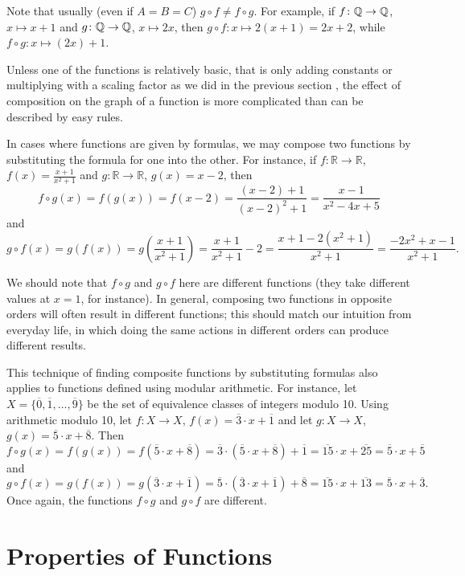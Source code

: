 Note that usually (even if $A=B=C$) $g\circ f\not=f\circ g$. For example, if
$f\colon{\mathbb Q}\to{\mathbb Q}$, $x\mapsto x+1$ and
$g\colon{\mathbb Q}\to{\mathbb Q}$, $x\mapsto 2x$, then $g\circ f\colon x\mapsto 2(x+1)=2x+2$, while
$f\circ g\colon x\mapsto (2x)+1$.
\smallskip

Unless one of the functions is relatively basic, that is only adding
constants or multiplying with a scaling factor as we did in the previous
section , the effect of
composition on the graph of a function is more complicated than can be
described by easy rules.
\bigskip

In cases where functions are given by formulas, we may compose two functions by substituting the formula for one into the other.
For instance, if $f \colon \mathbb{R} \to \mathbb{R}$, $f(x)=\frac{x+1}{x^2+1}$ and $g \colon \mathbb{R} \to \mathbb{R}$, $g(x) = x-2$, then
\[
f \circ g(x) = f(g(x)) = f(x-2) = \frac{(x-2)+1}{(x-2)^2+1}=\frac{x-1}{x^2-4x+5}
\]
and
\[
g \circ f(x) = g(f(x)) = g\left(\frac{x+1}{x^2+1} \right) = \frac{x+1}{x^2+1} -2 = \frac{x+1 - 2(x^2+1)}{x^2+1} = \frac{-2x^2+x-1}{x^2+1}.
\]

We should note that $f \circ g$ and $g \circ f$ here are different functions (they take different values at $x=1$, for instance).
In general, composing two functions in opposite orders will often result in different functions; this should match our intuition from everyday life, in which doing the same actions in different orders can produce different results.

This technique of finding composite functions by substituting formulas also applies to functions defined using modular arithmetic.
For instance, let $X = \{ \overline{0}, \overline{1}, \dots, \overline{9}\}$ be the set of equivalence classes of integers modulo 10.
Using arithmetic modulo 10, let $f \colon X \to X$, $f(x) = \overline{3}\cdot x + \overline{1}$ and let $g \colon X \to X$, $g(x) = \overline{5} \cdot x+\overline{8}$.
Then
\[
f \circ g(x) = f(g(x)) = f(\overline{5} \cdot x+\overline{8}) = \overline{3}\cdot (\overline{5} \cdot x+\overline{8}) + \overline{1}
= \overline{15} \cdot x + \overline{25} = \overline{5} \cdot x + \overline{5}
\]
and
\[
g \circ f(x) = g(f(x)) = g(\overline{3}\cdot x + \overline{1}) = \overline{5} \cdot (\overline{3}\cdot x + \overline{1})+\overline{8}
= \overline{15}\cdot x + \overline{13}
= \overline{5}\cdot x + \overline{3}.
\]
Once again, the functions $f \circ g$ and $g \circ f$ are different.


\section{Properties of Functions}

